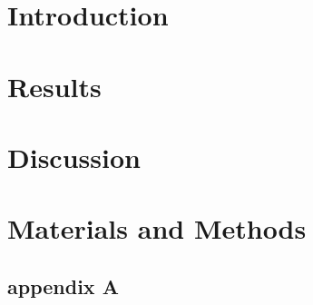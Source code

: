 \documentclass{Thesis}
\begin{document}
\setcounter{tocdepth}{3} %
\listoftodos
\frontmatter




\part{Introduction}












\part{Results}



\part{Discussion}

\part{Materials and Methods}
\appendix
\chapter{appendix A}
\blindtext[4]

\singlespacing


\end{document}

